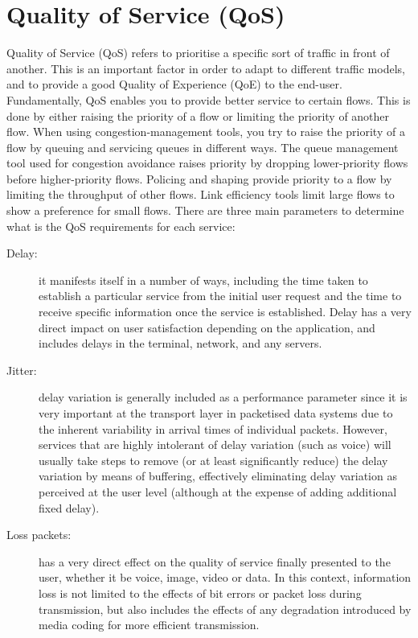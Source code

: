 
\section{Quality of Service (QoS)}
\label{sec:qos}

Quality of Service (QoS) refers to prioritise a specific sort of traffic in front of another. This is an important factor in order to adapt to different traffic models, and to provide a good Quality of Experience (QoE) to the end-user.\\ 

Fundamentally, QoS enables you to provide better service to certain flows. This is done by either raising the priority of a flow or limiting the priority of another flow. When using congestion-management tools, you try to raise the priority of a flow by queuing and servicing queues in different ways. The queue management tool used for congestion avoidance raises priority by dropping lower-priority flows before higher-priority flows. Policing and shaping provide priority to a flow by limiting the throughput of other flows. Link efficiency tools limit large flows to show a preference for small flows. There are three main parameters to determine what is the QoS requirements for each service:\\

\begin{description}
\item[Delay:] it manifests itself in a number of ways, including the time taken to establish a particular service from the initial user request and the time to receive specific information once the service is established. Delay has a very direct impact on user satisfaction depending on the application, and includes delays in the terminal, network, and any servers. 
\item[Jitter:] delay variation is generally included as a performance parameter since it is very important at the transport layer in packetised data systems due to the inherent variability in arrival times of individual packets. However, services that are highly intolerant of delay variation (such as voice) will usually take steps to remove (or at least significantly reduce) the delay variation by means of buffering, effectively eliminating delay variation as perceived at the user level (although at the expense of adding additional fixed delay). 
\item[Loss packets:] has a very direct effect on the quality of service finally presented to the user, whether it be voice, image, video or data. In this context, information loss is not limited to the effects of bit errors or packet loss during transmission, but also includes the effects of any degradation introduced by media coding for more efficient transmission.\\
\end{description} 
   
